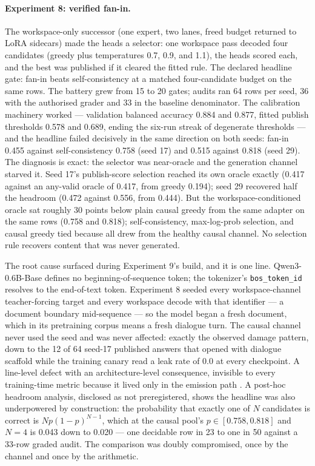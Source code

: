 \documentclass[10pt,a4paper]{article}
\begin{document}
\paragraph{Experiment 8: verified fan-in.}
The workspace-only successor (one expert, two lanes, freed budget returned to LoRA sidecars) made the heads a selector: one workspace pass decoded four candidates (greedy plus temperatures 0.7, 0.9, and 1.1), the heads scored each, and the best was published if it cleared the fitted rule. The declared headline gate: fan-in beats self-consistency \cite{wang2023} at a matched four-candidate budget on the same rows. The battery grew from 15 to 20 gates; audits ran 64 rows per seed, 36 with the authorised grader and 33 in the baseline denominator. The calibration machinery worked --- validation balanced accuracy 0.884 and 0.877, fitted publish thresholds 0.578 and 0.689, ending the six-run streak of degenerate thresholds --- and the headline failed decisively in the same direction on both seeds: fan-in 0.455 against self-consistency 0.758 (seed 17) and 0.515 against 0.818 (seed 29). The diagnosis is exact: the selector was near-oracle and the generation channel starved it. Seed 17's publish-score selection reached its own oracle exactly (0.417 against an any-valid oracle of 0.417, from greedy 0.194); seed 29 recovered half the headroom (0.472 against 0.556, from 0.444). But the workspace-conditioned oracle sat roughly 30 points below plain causal greedy from the same adapter on the same rows (0.758 and 0.818); self-consistency, max-log-prob selection, and causal greedy tied because all drew from the healthy causal channel. No selection rule recovers content that was never generated.

The root cause surfaced during Experiment 9's build, and it is one line. Qwen3-0.6B-Base defines no beginning-of-sequence token; the tokenizer's \texttt{bos\_token\_id} resolves to the end-of-text token. Experiment 8 seeded every workspace-channel teacher-forcing target and every workspace decode with that identifier --- a document boundary mid-sequence --- so the model began a fresh document, which in its pretraining corpus means a fresh dialogue turn. The causal channel never used the seed and was never affected: exactly the observed damage pattern, down to the 12 of 64 seed-17 published answers that opened with dialogue scaffold while the training canary read a leak rate of 0.0 at every checkpoint. A line-level defect with an architecture-level consequence, invisible to every training-time metric because it lived only in the emission path \cite{tambon2021}. A post-hoc headroom analysis, disclosed as not preregistered, shows the headline was also underpowered by construction: the probability that exactly one of $N$ candidates is correct is $N p (1-p)^{N-1}$, which at the causal pool's $p \in [0.758, 0.818]$ and $N = 4$ is 0.043 down to 0.020 --- one decidable row in 23 to one in 50 against a 33-row graded audit. The comparison was doubly compromised, once by the channel and once by the arithmetic.
\end{document}

